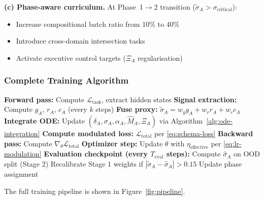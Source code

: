 \textbf{(c) Phase-aware curriculum.} At Phase~1$\to$2 transition
($\tilde{\sigma}_A > \sigma_{\text{critical}}$):
\begin{itemize}[nosep]
\item Increase compositional batch ratio from 10\% to 40\%
\item Introduce cross-domain intersection tasks
\item Activate executive control targets ($\Xi_A$ regularisation)
\end{itemize}

\subsubsection{Complete Training Algorithm}

\begin{algorithm}[H]
\caption{Σ-Model Training Step}\label{alg:training-step}
\begin{algorithmic}
\State \textbf{Forward pass:} Compute $\mathcal{L}_{\text{task}}$, extract hidden states
\State \textbf{Signal extraction:} Compute $g_A$, $r_A$, $c_A$ (every $k$ steps)
\State \textbf{Fuse proxy:} $\tilde{\sigma}_A = w_g g_A + w_r r_A + w_c c_A$
\State \textbf{Integrate ODE:} Update $(\delta_A, \sigma_A, \alpha_A, \hat{M}_A, \Xi_A)$ via Algorithm~\ref{alg:ode-integration}
\State \textbf{Compute modulated loss:} $\mathcal{L}_{\text{total}}$ per \eqref{eq:schema-loss}
\State \textbf{Backward pass:} Compute $\nabla_\theta \mathcal{L}_{\text{total}}$
\State \textbf{Optimizer step:} Update $\theta$ with $\eta_{\text{effective}}$ per \eqref{eq:lr-modulation}
\State \textbf{Evaluation checkpoint (every $T_{\text{eval}}$ steps):}
\State \hspace{\algorithmicindent} Compute $\hat{\sigma}_A$ on OOD split (Stage 2)
\State \hspace{\algorithmicindent} Recalibrate Stage 1 weights if $|\tilde{\sigma}_A - \hat{\sigma}_A| > 0.15$
\State \hspace{\algorithmicindent} Update phase assignment
\end{algorithmic}
\end{algorithm}



The full training pipeline is shown in Figure~\ref{fig:pipeline}.

